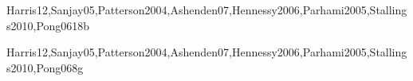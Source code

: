 \begin{syllabus}
\begin{unit}{\ARDigitallogicanddigitalsystems}{}{Harris12,Sanjay05,Patterson2004,Ashenden07,Hennessy2006,Parhami2005,Stallings2010,Pong06}{18}{b}
\begin{topics}%
\item \ARDigitallogicanddigitalsystemsTopicOverview
\item \ARDigitallogicanddigitalsystemsTopicCombinational
\item \ARDigitallogicanddigitalsystemsTopicMultiple
\item \ARDigitallogicanddigitalsystemsTopicComputer
\item \ARDigitallogicanddigitalsystemsTopicRegister
\item \ARDigitallogicanddigitalsystemsTopicPhysical
\end{topics}
\begin{learningoutcomes}
\item \ARDigitallogicanddigitalsystemsLODescribeTheComputer [\Familiarity]
\item \ARDigitallogicanddigitalsystemsLOComprehend [\Usage]
\item \ARDigitallogicanddigitalsystemsLOExplainTheThe [\Usage]
\item \ARDigitallogicanddigitalsystemsLOArticulate [\Familiarity]
\item \ARDigitallogicanddigitalsystemsLODesignThe [\Usage]
\item \ARDigitallogicanddigitalsystemsLOUseCad [\Familiarity]
\item \ARDigitallogicanddigitalsystemsLOEvaluate [\Assessment]
\end{learningoutcomes}
\end{unit}

\begin{unit}{\ARMachinelevelrepresentationofdata}{}{Harris12,Sanjay05,Patterson2004,Ashenden07,Hennessy2006,Parhami2005,Stallings2010,Pong06}{8}{g}
\begin{topics}
\item \ARMachinelevelrepresentationofdataTopicBits
\item \ARMachinelevelrepresentationofdataTopicNumeric
\item \ARMachinelevelrepresentationofdataTopicFixed
\item \ARMachinelevelrepresentationofdataTopicSigned
\item \ARMachinelevelrepresentationofdataTopicRepresentation
\item \ARMachinelevelrepresentationofdataTopicRepresentationOf
\end{topics}


\end{unit}
\end{syllabus}
